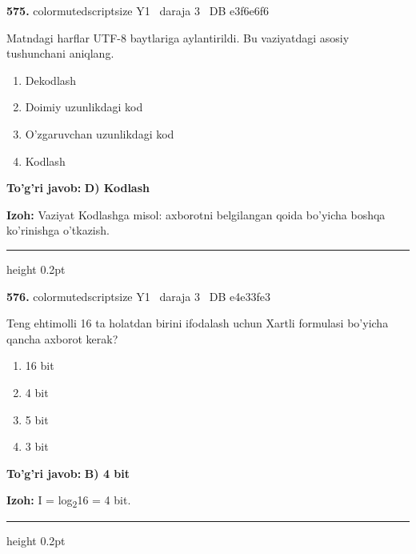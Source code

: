 \documentclass[10pt,a4paper,oneside]{article}
\begin{document}
\noindent\textbf{\color{ink}575.}  {color{muted}scriptsize Y1 \textbullet\ daraja 3 \textbullet\ DB e3f6e6f6}
\par
Matndagi harflar UTF-8 baytlariga aylantirildi. Bu vaziyatdagi asosiy tushunchani aniqlang.
\begin{enumerate}[label=\Alph*),leftmargin=9mm]
\item Dekodlash
\item Doimiy uzunlikdagi kod
\item O'zgaruvchan uzunlikdagi kod
\item Kodlash
\end{enumerate}
\begin{tcolorbox}[enhanced,breakable,colback=teal!4,colframe=teal!50!black,boxrule=0.5pt,arc=1.1mm,left=3mm,right=3mm,top=1.7mm,bottom=1.7mm,before skip=2mm,after skip=2mm]
\textbf{\color{teal}To'g'ri javob:} \textbf{D) Kodlash}
\par\smallskip
\textbf{Izoh:} Vaziyat Kodlashga misol: axborotni belgilangan qoida bo'yicha boshqa ko'rinishga o'tkazish.
\end{tcolorbox}
\vspace{2mm}\hrule height 0.2pt \vspace{3mm}

\noindent\textbf{\color{ink}576.}  {color{muted}scriptsize Y1 \textbullet\ daraja 3 \textbullet\ DB e4e33fe3}
\par
Teng ehtimolli 16 ta holatdan birini ifodalash uchun Xartli formulasi bo'yicha qancha axborot kerak?
\begin{enumerate}[label=\Alph*),leftmargin=9mm]
\item 16 bit
\item 4 bit
\item 5 bit
\item 3 bit
\end{enumerate}
\begin{tcolorbox}[enhanced,breakable,colback=teal!4,colframe=teal!50!black,boxrule=0.5pt,arc=1.1mm,left=3mm,right=3mm,top=1.7mm,bottom=1.7mm,before skip=2mm,after skip=2mm]
\textbf{\color{teal}To'g'ri javob:} \textbf{B) 4 bit}
\par\smallskip
\textbf{Izoh:} I = log\textsubscript{2}16 = 4 bit.
\end{tcolorbox}
\vspace{2mm}\hrule height 0.2pt \vspace{3mm}
\end{document}
